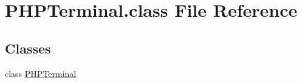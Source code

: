 \hypertarget{PHPTerminal_8class}{\section{P\-H\-P\-Terminal.\-class File Reference}
\label{PHPTerminal_8class}
}
\subsection*{Classes}
\begin{DoxyCompactItemize}
\item 
class \hyperlink{classPHPTerminal}{P\-H\-P\-Terminal}
\end{DoxyCompactItemize}

